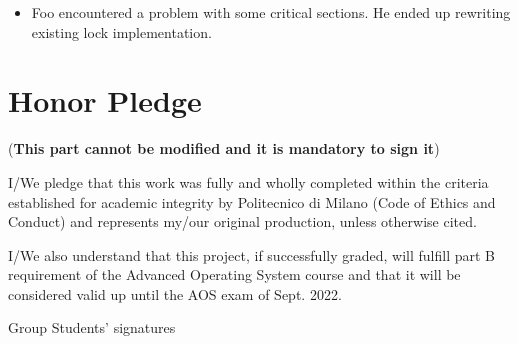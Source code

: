 \documentclass[10pt,a4]{article}
\begin{document}
\begin{itemize}
\item Foo encountered a problem with some critical sections. He ended up
  rewriting existing lock implementation.
\end{itemize}

\section{Honor Pledge}
(\textbf{This part cannot be modified and it is mandatory to sign it})

I/We pledge that this work was fully and wholly completed within the criteria
established for academic integrity by Politecnico di Milano (Code of Ethics and
Conduct) and represents my/our original production, unless otherwise cited.

I/We also understand that this project, if successfully graded,  will fulfill part B requirement of the
Advanced Operating System course and that it will be considered valid up until
the AOS exam of Sept. 2022. 

\begin{flushright}
Group Students' signatures
\end{flushright}
\end{document}
